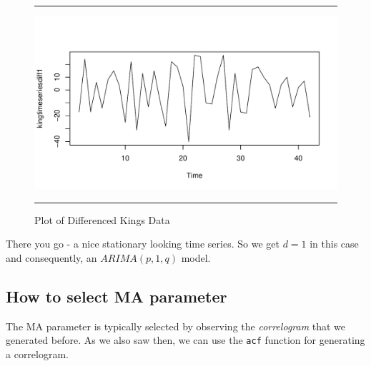 \documentclass[11pt, letterpaper, twoside]{memoir}\usepackage{knitr}
\begin{document}
\begin{figure}
\centering
\rule{4in}{1pt}
\begin{knitrout}
\color{fgcolor}\begin{kframe}
\begin{alltt}
 \hlkwb{<-}  \hlstd{=}\hlstd{)}
\end{alltt}
\end{kframe}
\includegraphics[width=\maxwidth]{figure/unnamed-chunk-120-1} 

\end{knitrout}
\caption{Plot of Differenced Kings Data}
\label{Fig:plotdifking}
\rule{4in}{1pt}
\end{figure}

There you go - a nice stationary looking time series. So we get $d = 1$ in this case and consequently, an $ARIMA(p, 1, q)$ model.

\subsection{How to select MA parameter}

The MA parameter is typically selected by observing the \emph{correlogram} that we generated before. As we also saw then, we can use the \texttt{acf} function for generating a correlogram.
\end{document}
